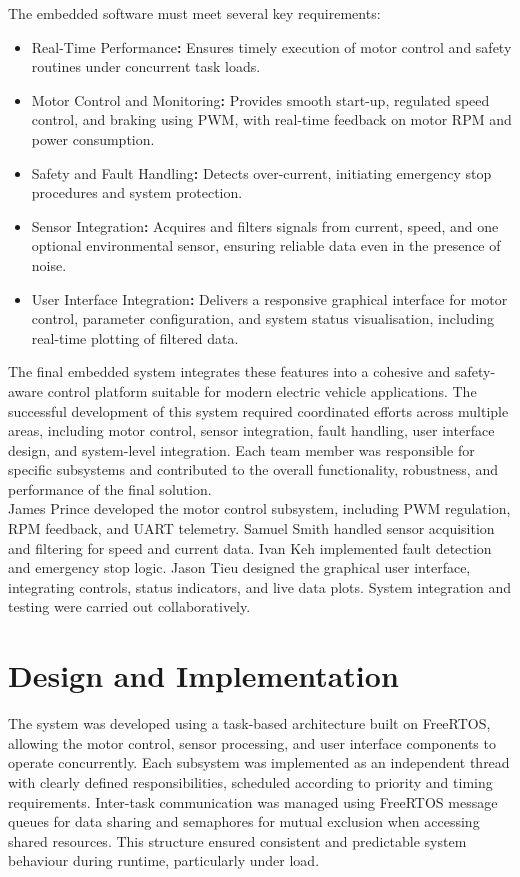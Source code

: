 \documentclass[a4paper, 11pt, titlepage]{article}
\begin{document}
The embedded software must meet several key requirements:
\begin{itemize}
    \item Real-Time Performance\textbf{:} Ensures timely execution of motor control and safety routines under concurrent task loads.
    \item Motor Control and Monitoring\textbf{:} Provides smooth start-up, regulated speed control, and braking using PWM, with real-time feedback on motor RPM and power consumption.
    \item Safety and Fault Handling\textbf{:} Detects over-current, initiating emergency stop procedures and system protection.
    \item Sensor Integration\textbf{:} Acquires and filters signals from current, speed, and one optional environmental sensor, ensuring reliable data even in the presence of noise.
    \item User Interface Integration\textbf{:} Delivers a responsive graphical interface for motor control, parameter configuration, and system status visualisation, including real-time plotting of filtered data.

\end{itemize}
The final embedded system integrates these features into a cohesive and safety-aware control platform suitable for modern electric vehicle applications. The successful development of this system required coordinated efforts across multiple areas, including motor control, sensor integration, fault handling, user interface design, and system-level integration. Each team member was responsible for specific subsystems and contributed to the overall functionality, robustness, and performance of the final solution. \\

James Prince developed the motor control subsystem, including PWM regulation, RPM feedback, and UART telemetry. Samuel Smith handled sensor acquisition and filtering for speed and current data. Ivan Keh implemented fault detection and emergency stop logic. Jason Tieu designed the graphical user interface, integrating controls, status indicators, and live data plots. System integration and testing were carried out collaboratively. 
 
\section{Design and Implementation}
The system was developed using a task-based architecture built on FreeRTOS, allowing the motor control, sensor processing, and user interface components to operate concurrently. Each subsystem was implemented as an independent thread with clearly defined responsibilities, scheduled according to   priority and timing requirements. Inter-task communication was managed using FreeRTOS message queues for data sharing and semaphores for mutual exclusion when accessing shared resources. This structure ensured consistent and predictable system behaviour during runtime, particularly under load. \\
\end{document}

